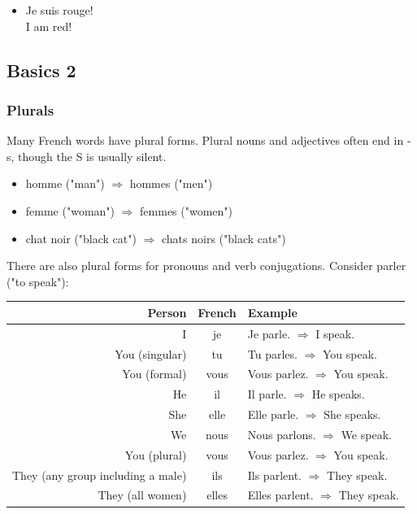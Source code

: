 \begin{itemize}
  \item  Je suis rouge! \\ I am red!
\end{itemize}


\pagebreak
\subsection{Basics 2}

\subsubsection{Plurals}

Many French words have plural forms. Plural nouns and adjectives often end in -s, though the S is usually silent.

\begin{itemize}
  \item  homme ("man") $\Rightarrow$ hommes ("men")
  \item  femme ("woman") $\Rightarrow$ femmes ("women")
  \item  chat noir ("black cat") $\Rightarrow$ chats noirs ("black cats")
\end{itemize}

There are also plural forms for pronouns and verb conjugations. Consider parler ("to speak"):

\begin{center}
\begin{tabular}{|r|c|l|}
\hline
\textbf{Person}                   & \textbf{French} & \textbf{Example}             \\ \hline
I                                 & je              & Je parle. $\Rightarrow$ I speak.         \\ \hline
You (singular)                    & tu              & Tu parles. $\Rightarrow$ You speak.      \\ \hline
You (formal)                      & vous            & Vous parlez. $\Rightarrow$ You speak.    \\ \hline
He                                & il              & Il parle. $\Rightarrow$ He speaks.       \\ \hline
She                               & elle            & Elle parle. $\Rightarrow$ She speaks.    \\ \hline
We                                & nous            & Nous parlons. $\Rightarrow$ We speak.    \\ \hline
You (plural)                      & vous            & Vous parlez. $\Rightarrow$ You speak.    \\ \hline
They (any group including a male) & ils             & Ils parlent. $\Rightarrow$ They speak.   \\ \hline
They (all women)                  & elles           & Elles parlent. $\Rightarrow$ They speak. \\ \hline
\end{tabular}
\end{center}

